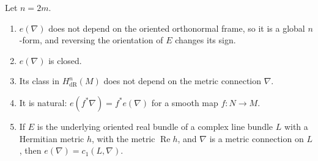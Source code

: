 \begin{proposition}\label{characteristic-classes:proposition-euler-form}
Let $n = 2m$.
\begin{enumerate}
\item $e(\nabla)$ does not depend on the oriented orthonormal frame, so it is a global $n$-form, and reversing the orientation of $E$ changes its sign.
\item $e(\nabla)$ is closed.
\item Its class in $H^n_{\mathrm{dR}}(M)$ does not depend on the metric connection $\nabla$.
\item It is natural: $e(f^*\nabla) = f^*e(\nabla)$ for a smooth map $f \colon N \to M$.
\item If $E$ is the underlying oriented real bundle of a complex line bundle $L$ with a Hermitian metric $h$, with the metric $\operatorname{Re}h$, and $\nabla$ is a metric connection on $L$,
then $e(\nabla) = c_1(L, \nabla)$.
\end{enumerate}
\end{proposition}

